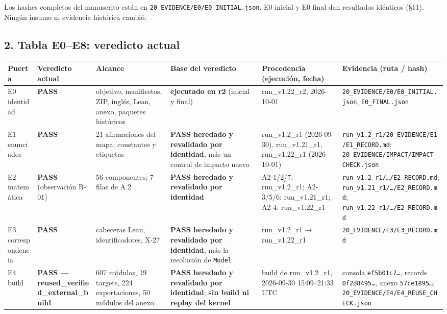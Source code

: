 \documentclass[
]{article}
\newcounter{none} %
\begin{document}
Los hashes completos del manuscrito están en
\texttt{20\_EVIDENCE/E0/E0\_INITIAL.json}. E0 inicial y E0 final dan
resultados idénticos (§11). Ningún insumo ni evidencia histórica cambió.

\subsection{2. Tabla E0--E8: veredicto
actual}\label{2-tabla-e0e8-veredicto-actual}

{\def\LTcaptype{none} %
\begin{longtable}[]{@{}llllll@{}}
\toprule\noalign{}
Puerta & Veredicto actual & Alcance & Base del veredicto & Procedencia
(ejecución, fecha) & Evidencia (ruta / hash) \\
\midrule\noalign{}
\endhead
\bottomrule\noalign{}
\endlastfoot
E0 identidad & \textbf{PASS} & objetivo, manifiestos, ZIP, inglés, Lean,
anexo, paquetes históricos & \textbf{ejecutado en r2} (inicial y final)
& run\_v1.22\_r2, 2026-10-01 &
\texttt{20\_EVIDENCE/E0/E0\_INITIAL.json}, \texttt{E0\_FINAL.json} \\
E1 enunciados & \textbf{PASS} & 21 afirmaciones del mapa; constantes y
etiquetas & \textbf{PASS heredado y revalidado por identidad}, más un
control de impacto nuevo & run\_v1.2\_r1 (2026-09-30), run\_v1.21\_r1,
run\_v1.22\_r1 (2026-10-01) &
\texttt{run\_v1.2\_r1/20\_EVIDENCE/E1/E1\_RECORD.md};
\texttt{20\_EVIDENCE/IMPACT/IMPACT\_CHECK.json} \\
E2 matemática & \textbf{PASS} (observación R-01) & 56 componentes; 7
filas de A.2 & \textbf{PASS heredado y revalidado por identidad} &
A2-1/2/7: run\_v1.2\_r1; A2-3/5/6: run\_v1.21\_r1; A2-4: run\_v1.22\_r1
& \texttt{run\_v1.2\_r1/…/E2\_RECORD.md};
\texttt{run\_v1.21\_r1/…/E2\_RECORD.md};
\texttt{run\_v1.22\_r1/…/E2\_RECORD.md} \\
E3 correspondencia & \textbf{PASS} & cabeceras Lean, identificadores,
X-27 & \textbf{PASS heredado y revalidado por identidad}, más la
resolución de \texttt{Model} & run\_v1.2\_r1 → run\_v1.22\_r1 &
\texttt{20\_EVIDENCE/E3/E3\_RECORD.md} \\
E4 build & \textbf{PASS --- reused\_verified\_external\_build} & 607
módulos, 19 targets, 224 exportaciones, 50 módulos del anexo &
\textbf{PASS heredado y revalidado por identidad}; \textbf{sin build ni
replay del kernel} & build de run\_v1.2\_r1, 2026-09-30 15:09--21:33 UTC
& consola \texttt{ef5b01c7…}, records \texttt{0f2d8495…}, anexo
\texttt{57ce1895…}; \texttt{20\_EVIDENCE/E4/E4\_REUSE\_CHECK.json} \\

\end{longtable}}
\end{document}
